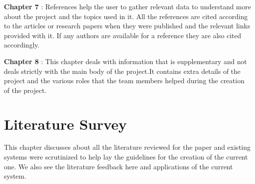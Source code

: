 \documentclass[a4paper,12pt]{report}
\begin{document}
\par \textbf{Chapter 7} : References help the user to gather relevant data to understand more about the project and the topics used in it. All the references are cited according to the articles or research papers when they were published and the relevant links provided with it. If any authors are available for a reference they are also cited accordingly. \\

\par \textbf{Chapter 8} : This chapter deals with information that is supplementary and not deals strictly with the main body of the project.It contains extra details of the project and the various roles that the team members helped during the creation of the project. \\




\chapter{Literature Survey}


    \par This chapter discusses about all the literature reviewed for the paper and existing systems were scrutinized to help lay the guidelines for the creation of the current one. We also see the literature feedback here and applications of the current system. \\
\end{document}
